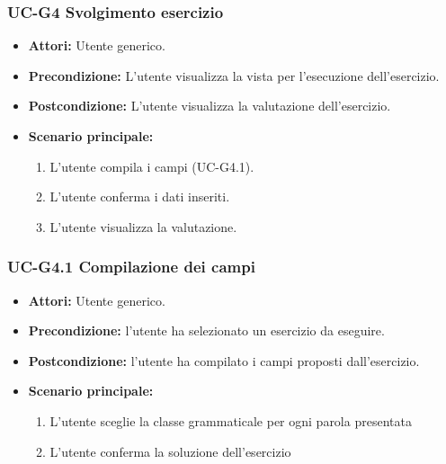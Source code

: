 	\subsubsection{UC-G4 Svolgimento esercizio}
		\begin{itemize}
			\item \textbf{Attori:} Utente generico.
			\item \textbf{Precondizione:}  L'utente visualizza la vista per l'esecuzione dell'esercizio.
			\item \textbf{Postcondizione:} L'utente visualizza la valutazione dell'esercizio.
			\item \textbf{Scenario principale:}
				\begin{enumerate}
					\item L'utente compila i campi (UC-G4.1).
					\item L'utente conferma i dati inseriti.
					\item L'utente visualizza la valutazione.
				\end{enumerate}
		\end{itemize}

	\subsubsection{UC-G4.1 Compilazione dei campi}
		\begin{itemize}
			\item \textbf{Attori:} Utente generico.
			\item \textbf{Precondizione:} l'utente ha selezionato un esercizio da eseguire.
			\item \textbf{Postcondizione:} l'utente ha compilato i campi proposti dall'esercizio.
			\item \textbf{Scenario principale:}
				\begin{enumerate}
					\item L'utente sceglie la classe grammaticale per ogni parola presentata
					\item L'utente conferma la soluzione dell'esercizio
				\end{enumerate}
		\end{itemize}
		
